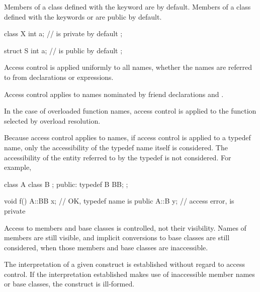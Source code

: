 \pnum
{}%
%
%
Members of a class defined with the keyword
are
by default.
Members of a class defined with the keywords
 or 
are public by default.
\begin{example}

\begin{codeblock}
class X {
  int a;            //  is private by default
};

struct S {
  int a;            //  is public by default
};
\end{codeblock}
\end{example}

\pnum
Access control is applied uniformly to all names, whether the names are
referred to from declarations or expressions.
\begin{note}
Access control applies to names nominated by
friend declarations and
.
\end{note}
In the case of overloaded function names, access control is applied to
the function selected by overload resolution.
\begin{note}
Because access control applies to names, if access control is applied to a
typedef name, only the accessibility of the typedef name itself is considered.
The accessibility of the entity referred to by the typedef is not considered.
For example,

\begin{codeblock}
class A {
  class B { };
public:
  typedef B BB;
};

void f() {
  A::BB x;          // OK, typedef name  is public
  A::B y;           // access error,  is private
}
\end{codeblock}
\end{note}

\pnum
\begin{note}
Access to members and base classes is controlled, not their
visibility.
Names of members are still visible, and implicit conversions to base
classes are still considered, when those members and base classes are
inaccessible.
\end{note}
The interpretation of a given construct is
established without regard to access control.
If the interpretation
established makes use of inaccessible member names or base classes,
the construct is ill-formed.

